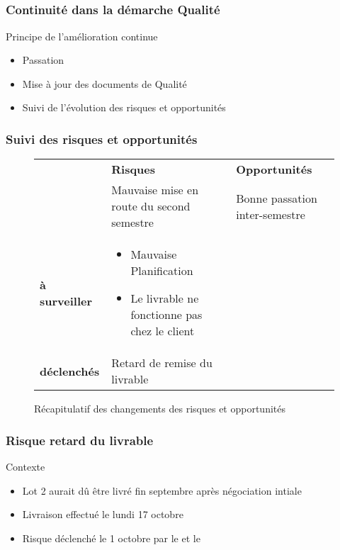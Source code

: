 
\speaker{\Kafui}

\subsection{} %


\begin{frame}
\frametitle{Continuité dans la démarche Qualité}
\begin{block}{Principe de l'amélioration continue}
\begin{itemize}
\item Passation 
\item Mise à jour des documents de Qualité
\item Suivi de l'évolution des risques et opportunités
\end{itemize}
\end{block}
\end{frame}




\begin{frame}
\frametitle{Suivi des risques et opportunités}
\begin{figure}
\begin{longtable}{|p{1.8cm}||p{3.5cm}|p{3.5cm}|}
\hline
 & \textbf{Risques} & \textbf{Opportunités} \\\hhline{|=||=|=|}
\multirow{1}{*}{\textbf{clôturés}} & \small Mauvaise mise en route du second semestre & \small Bonne passation inter-semestre \\\hline
\multirow{1}{*}{\textbf{à surveiller}} & \small \begin{itemize}	
						\item Mauvaise Planification
						\item Le livrable ne fonctionne pas chez le client
						\end{itemize}& \\\hline
\multirow{1}{*}{\textbf{déclenchés}} & \small Retard de remise du livrable & \\\hline
\end{longtable}
\caption{Récapitulatif des changements des risques et opportunités}
\end{figure}
\end{frame}



\begin{frame}
\frametitle{Risque retard du livrable}
\begin{block}{Contexte}
\begin{itemize}
\item Lot 2 aurait dû être livré fin septembre après négociation intiale
\item Livraison effectué le lundi 17 octobre
\item Risque déclenché le 1 octobre par le \RQ{} et le \CP{}
\end{itemize}
\end{block}
\end{frame}

